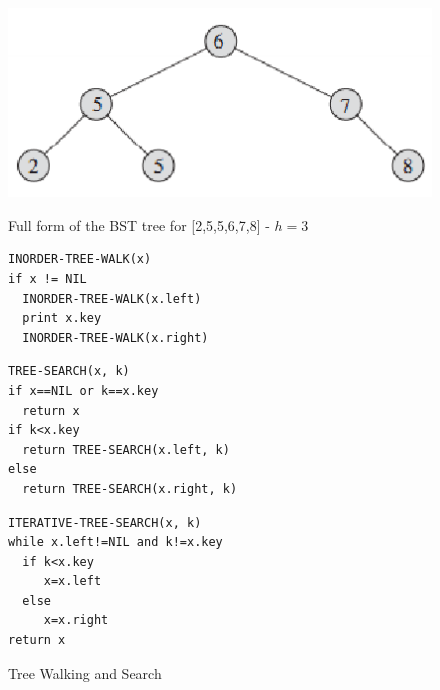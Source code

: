 \documentclass[10pt,a4paper]{article}
\begin{document}
\begin{figure}
\caption{Full form of the BST tree for {[2,5,5,6,7,8]} - $h=3$}
\begin{center}
\includegraphics[scale=0.43]{../images/bstfull.png}
\label{bstfull}
\end{center}
\end{figure}


\begin{figure}
\caption{Tree Walking and Search}
\begin{center}
\begin{lstlisting}
INORDER-TREE-WALK(x)
if x != NIL
  INORDER-TREE-WALK(x.left)
  print x.key
  INORDER-TREE-WALK(x.right)
\end{lstlisting}

\begin{lstlisting}
TREE-SEARCH(x, k)
if x==NIL or k==x.key
  return x
if k<x.key
  return TREE-SEARCH(x.left, k)
else
  return TREE-SEARCH(x.right, k)
\end{lstlisting}


\begin{lstlisting}
ITERATIVE-TREE-SEARCH(x, k)
while x.left!=NIL and k!=x.key
  if k<x.key
     x=x.left
  else  
     x=x.right
return x
\end{lstlisting}
\label{walkandsearch}
\end{center}
\end{figure}
\end{document}
